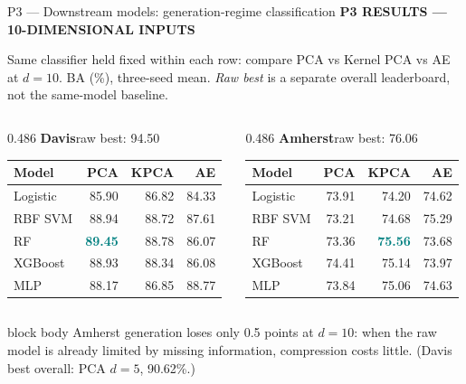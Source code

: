 \documentclass[aspectratio=169,11pt]{beamer}
\newcommand{\sectiontag}[1]{{\footnotesize\usebeamercolor[fg]{structure}\textbf{#1}}\par\vspace{0.10cm}}
\newcommand{\smallmuted}[1]{{\footnotesize\color{slate}#1\par}}
\begin{document}
\begin{frame}{P3 — Downstream models: generation-regime classification}
\sectiontag{P3 \quad RESULTS — 10-DIMENSIONAL INPUTS}
\smallmuted{Same classifier held fixed within each row: compare PCA vs Kernel PCA vs AE at $d=10$. BA (\%), three-seed mean. \emph{Raw best} is a separate overall leaderboard, not the same-model baseline.}\vspace{0.18cm}
\begin{columns}[T,onlytextwidth]
\begin{column}{0.486\textwidth}
\textbf{Davis}\hfill{\scriptsize raw best: 94.50}\par\vspace{0.12cm}
{\fontsize{8.8}{10.4}\selectfont
\setlength{\tabcolsep}{3.9pt}
\renewcommand{\arraystretch}{1.39}
\begin{tabular}{@{}lrrr@{}}\toprule
\textbf{Model} & \textbf{PCA} & \textbf{KPCA} & \textbf{AE}\\\midrule
Logistic & 85.90 & 86.82 & 84.33\\
RBF SVM & 88.94 & 88.72 & 87.61\\
RF & \textcolor{teal}{\textbf{89.45}} & 88.78 & 86.07\\
XGBoost & 88.93 & 88.34 & 86.08\\
MLP & 88.17 & 86.85 & 88.77\\
\bottomrule\end{tabular}}
\end{column}
\begin{column}{0.486\textwidth}
\textbf{Amherst}\hfill{\scriptsize raw best: 76.06}\par\vspace{0.12cm}
{\fontsize{8.8}{10.4}\selectfont
\setlength{\tabcolsep}{3.9pt}
\renewcommand{\arraystretch}{1.39}
\begin{tabular}{@{}lrrr@{}}\toprule
\textbf{Model} & \textbf{PCA} & \textbf{KPCA} & \textbf{AE}\\\midrule
Logistic & 73.91 & 74.20 & 74.62\\
RBF SVM & 73.21 & 74.68 & 75.29\\
RF & 73.36 & \textcolor{teal}{\textbf{75.56}} & 73.68\\
XGBoost & 74.41 & 75.14 & 73.97\\
MLP & 73.84 & 75.06 & 74.63\\
\bottomrule\end{tabular}}
\end{column}
\end{columns}
\vspace{0.30cm}
\begin{beamercolorbox}[wd=\linewidth,sep=0.14cm]{block body}
\footnotesize Amherst generation loses only 0.5 points at $d=10$: when the raw model is already limited by missing information, compression costs little. (Davis best overall: PCA $d=5$, 90.62\%.)
\end{beamercolorbox}
\end{frame}
\end{document}
